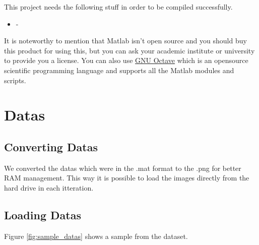 \documentclass[a4paper, openany]{book}
\begin{document}
This project needs the following stuff in order to be compiled successfully.

\begin{itemize}
\item -

\end{itemize}

It is noteworthy to mention that Matlab isn't open source and you should buy this product for using this, but you can ask your academic institute or university to provide you a license. You can also use \href{https://www.gnu.org/software/octave/index}{GNU Octave} which is an open\-source scientific programming language and supports all the Matlab modules and scripts.


\newpage

\section{Datas}
\subsection{Converting Datas}
We converted the datas which were in the .mat format to the .png  for better RAM management. This way it is possible to load the images directly from the hard drive in each itteration.

\subsection{Loading Datas}
Figure \ref{fig:sample_datas} shows a sample from the dataset.
\end{document}
